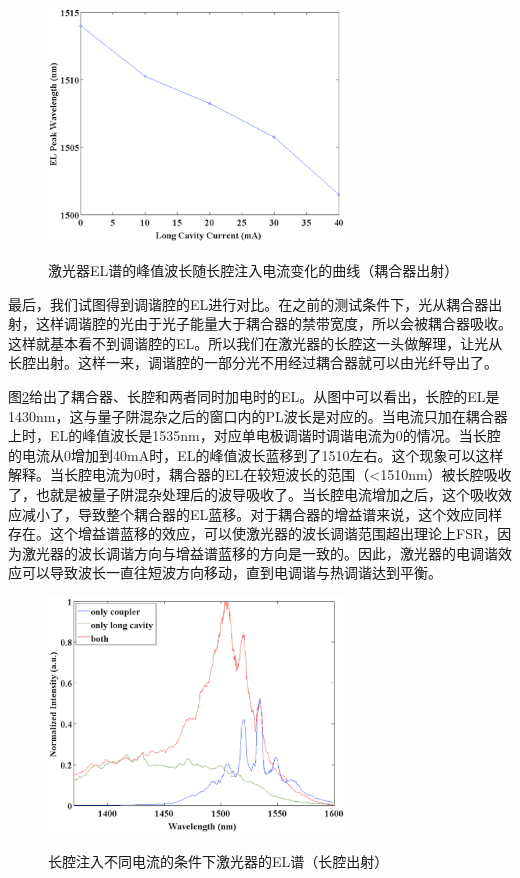 \documentclass{ZJUthesis}
\begin{document}
\begin{figure}[!ht]
  \centering
  \includegraphics[width=0.7\textwidth]{./Pictures/blueshift3.eps}\\
  \caption{激光器EL谱的峰值波长随长腔注入电流变化的曲线（耦合器出射）}
  \label{fig_blueshift3}
\end{figure}

最后，我们试图得到调谐腔的EL进行对比。在之前的测试条件下，光从耦合器出射，这样调谐腔的光由于光子能量大于耦合器的禁带宽度，所以会被耦合器吸收。这样就基本看不到调谐腔的EL。所以我们在激光器的长腔这一头做解理，让光从长腔出射。这样一来，调谐腔的一部分光不用经过耦合器就可以由光纤导出了。

图\ref{fig_blueshift4}给出了耦合器、长腔和两者同时加电时的EL。从图中可以看出，长腔的EL是1430nm，这与量子阱混杂之后的窗口内的PL波长是对应的。当电流只加在耦合器上时，EL的峰值波长是1535nm，对应单电极调谐时调谐电流为0的情况。当长腔的电流从0增加到40mA时，EL的峰值波长蓝移到了1510左右。这个现象可以这样解释。当长腔电流为0时，耦合器的EL在较短波长的范围（<1510nm）被长腔吸收了，也就是被量子阱混杂处理后的波导吸收了。当长腔电流增加之后，这个吸收效应减小了，导致整个耦合器的EL蓝移。对于耦合器的增益谱来说，这个效应同样存在。这个增益谱蓝移的效应，可以使激光器的波长调谐范围超出理论上FSR，因为激光器的波长调谐方向与增益谱蓝移的方向是一致的。因此，激光器的电调谐效应可以导致波长一直往短波方向移动，直到电调谐与热调谐达到平衡。

\begin{figure}[!ht]
  \centering
  \includegraphics[width=0.7\textwidth]{./Pictures/blueshift4.eps}\\
  \caption{长腔注入不同电流的条件下激光器的EL谱（长腔出射）}
  \label{fig_blueshift4}
\end{figure}
\end{document}
